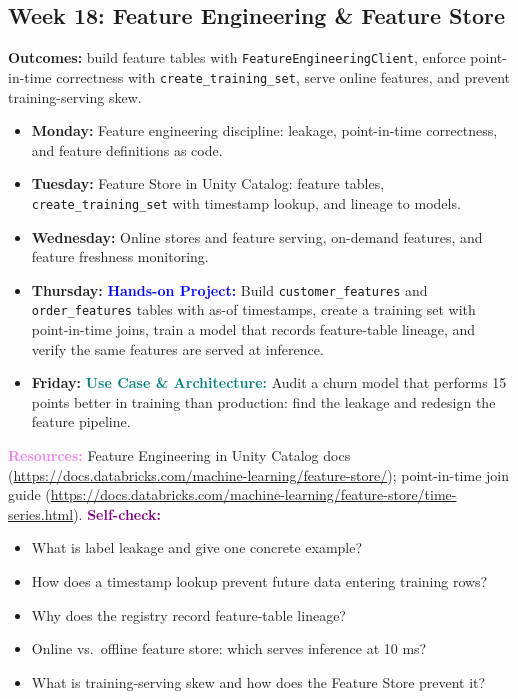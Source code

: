 \documentclass[11pt, a4paper]{article}
\newcommand{\project}[1]{\vspace{1mm}\noindent\textbf{\textcolor{blue}{Hands-on Project:}} #1}
\newcommand{\usecase}[1]{\vspace{1mm}\noindent\textbf{\textcolor{teal}{Use Case \& Architecture:}} #1}
\newcommand{\dayitem}[2]{\item \textbf{#1:} #2}
\newcommand{\resources}[1]{\vspace{1mm}\noindent\textbf{\textcolor{violet}{Resources:}} #1}
\newcommand{\selfcheck}[1]{\vspace{1mm}\noindent\textbf{\textcolor{purple}{Self-check:}} #1}
\begin{document}
\subsection*{Week 18: Feature Engineering \& Feature Store}
\par\noindent\textbf{Outcomes:} build feature tables with \texttt{FeatureEngineeringClient}, enforce point-in-time correctness with \texttt{create\_training\_set}, serve online features, and prevent training-serving skew.
\begin{itemize}[label=-]
    \dayitem{Monday}{Feature engineering discipline: leakage, point-in-time correctness, and feature definitions as code.}
    \dayitem{Tuesday}{Feature Store in Unity Catalog: feature tables, \texttt{create\_training\_set} with timestamp lookup, and lineage to models.}
    \dayitem{Wednesday}{Online stores and feature serving, on-demand features, and feature freshness monitoring.}
    \dayitem{Thursday}{\project{Build \texttt{customer\_features} and \texttt{order\_features} tables with as-of timestamps, create a training set with point-in-time joins, train a model that records feature-table lineage, and verify the same features are served at inference.}}
    \dayitem{Friday}{\usecase{Audit a churn model that performs 15 points better in training than production: find the leakage and redesign the feature pipeline.}}
\end{itemize}
\resources{Feature Engineering in Unity Catalog docs (\url{https://docs.databricks.com/machine-learning/feature-store/}); point-in-time join guide (\url{https://docs.databricks.com/machine-learning/feature-store/time-series.html}).}
\selfcheck{\begin{itemize}[label=-, leftmargin=1.5em, itemsep=0pt]
    \item What is label leakage and give one concrete example?
    \item How does a timestamp lookup prevent future data entering training rows?
    \item Why does the registry record feature-table lineage?
    \item Online vs.\ offline feature store: which serves inference at 10 ms?
    \item What is training-serving skew and how does the Feature Store prevent it?
\end{itemize}}
\end{document}
